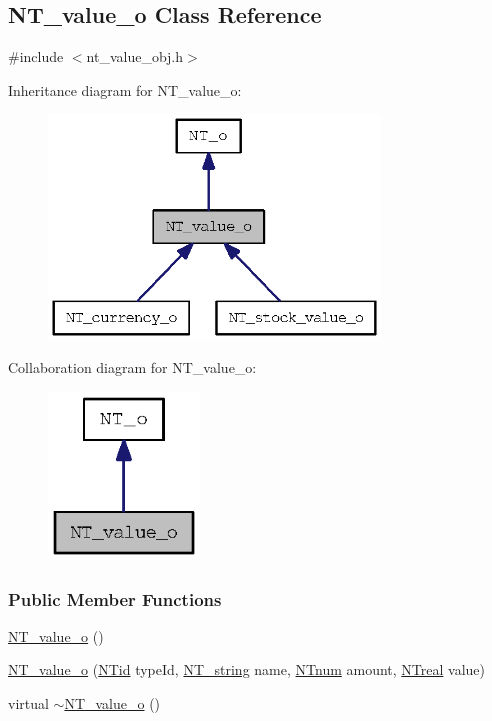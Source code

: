 \subsection{NT\_\-value\_\-o Class Reference}
\label{class_n_t__value__o}


{\ttfamily \#include $<$nt\_\-value\_\-obj.h$>$}



Inheritance diagram for NT\_\-value\_\-o:
\nopagebreak
\begin{figure}[H]
\begin{center}
\leavevmode
\includegraphics[width=250pt]{class_n_t__value__o__inherit__graph}
\end{center}
\end{figure}


Collaboration diagram for NT\_\-value\_\-o:
\nopagebreak
\begin{figure}[H]
\begin{center}
\leavevmode
\includegraphics[width=114pt]{class_n_t__value__o__coll__graph}
\end{center}
\end{figure}
\subsubsection*{Public Member Functions}
\begin{DoxyCompactItemize}
\item 
\hyperlink{class_n_t__value__o_a564c5482ae6bdf61482deb217b245cae}{NT\_\-value\_\-o} ()
\item 
\hyperlink{class_n_t__value__o_a3542d9bc7ea2d24ce37df26f940ef348}{NT\_\-value\_\-o} (\hyperlink{nt__types_8h_ab5cab5f78fdd2211c340cbe527a4afd7}{NTid} typeId, \hyperlink{nt__types_8h_a6ad3365da89b8087ee1b784feec0d896}{NT\_\-string} name, \hyperlink{nt__types_8h_a2b739eac0beddc8a5dac5311c2ba7320}{NTnum} amount, \hyperlink{nt__types_8h_a814a97893e9deb1eedcc7604529ba80d}{NTreal} value)
\item 
virtual \hyperlink{class_n_t__value__o_a67e04845b0ebfafb0f58133acb1e9e5e}{$\sim$NT\_\-value\_\-o} ()
\end{DoxyCompactItemize}
